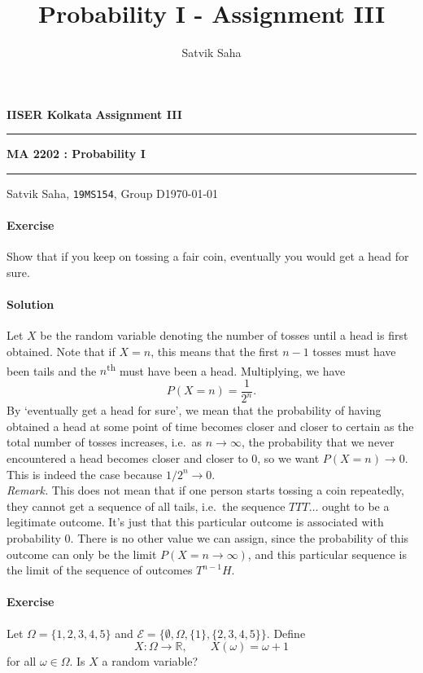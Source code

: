 \documentclass[10pt]{article}
\title{Probability I - Assignment III}
\author{Satvik Saha}
\date{}
\newcounter{prob}
\def\problem{\stepcounter{prob}\paragraph{Exercise \arabic{prob}}}
\def\solution{\paragraph{Solution}}
\begin{document}
        \par\textbf{IISER Kolkata} \hfill \textbf{Assignment III}
        \vspace{3pt}
        \hrule
        \vspace{3pt}
        \begin{center}
                \LARGE{\textbf{MA 2202 : Probability I}}
        \end{center}
        \vspace{3pt}
        \hrule
        \vspace{3pt}
        Satvik Saha, \texttt{19MS154}, Group D\hfill\today
        \vspace{20pt}

        \problem Show that if you keep on tossing a fair coin, eventually you would
        get a head for sure.

        \solution Let $X$ be the random variable denoting the number of tosses until
        a head is first obtained. Note that if $X = n$, this means that the first $n
        - 1$ tosses must have been tails and the $n$\textsuperscript{th} must have
        been a head. Multiplying, we have \[
            P(X = n) = \frac{1}{2^{n}}.
        \] By `eventually get a head for sure', we mean that the probability of
        having obtained a head at some point of time becomes closer and closer to
        certain as the total number of tosses increases, i.e.\ as $n \to \infty$,
        the probability that we never encountered a head becomes closer and closer
        to $0$, so we want $P(X = n) \to 0$. This is indeed the case because $1 /
        2^n \to 0$. \\

        \textit{Remark.} This does not mean that if one person starts tossing a coin
        repeatedly, they cannot get a sequence of all tails, i.e.\ the sequence
        $TTT\dots$ ought to be a legitimate outcome. It's just that this particular
        outcome is associated with probability 0. There is no other value we can
        assign, since the probability of this outcome can only be the limit $P(X =
        n \to \infty)$, and this particular sequence is the limit of the sequence of
        outcomes $T^{n - 1}H$.

        \problem Let $\Omega = \{1, 2, 3, 4, 5\}$ and $\mathcal{E} = \{\emptyset,
        \Omega, \{1\}, \{2, 3, 4, 5\}\}$. Define \[
            X\colon \Omega \to \mathbb{R}, \qquad X(\omega) = \omega + 1
        \] for all $\omega \in \Omega$. Is $X$ a random variable?
\end{document}
